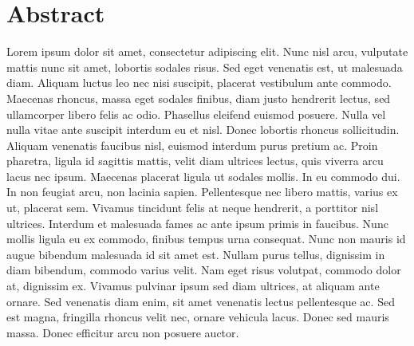 \chapter*{Abstract}

Lorem ipsum dolor sit amet, consectetur adipiscing elit. Nunc nisl arcu, vulputate mattis nunc sit 
amet, lobortis sodales risus. Sed eget venenatis est, ut malesuada diam. Aliquam luctus leo nec 
nisi suscipit, placerat vestibulum ante commodo. Maecenas rhoncus, massa eget sodales finibus, diam
justo hendrerit lectus, sed ullamcorper libero felis ac odio. Phasellus eleifend euismod posuere.
Nulla vel nulla vitae ante suscipit interdum eu et nisl. Donec lobortis rhoncus sollicitudin. 
Aliquam venenatis faucibus nisl, euismod interdum purus pretium ac. Proin pharetra, ligula id
sagittis mattis, velit diam ultrices lectus, quis viverra arcu lacus nec ipsum. Maecenas placerat
ligula ut sodales mollis. In eu commodo dui. In non feugiat arcu, non lacinia sapien. Pellentesque
nec libero mattis, varius ex ut, placerat sem. Vivamus tincidunt felis at neque hendrerit, a 
porttitor nisl ultrices. Interdum et malesuada fames ac ante ipsum primis in faucibus. Nunc mollis 
ligula eu ex commodo, finibus tempus urna consequat. Nunc non mauris id augue bibendum malesuada 
id sit amet est. Nullam purus tellus, dignissim in diam bibendum, commodo varius velit. Nam eget 
risus volutpat, commodo dolor at, dignissim ex. Vivamus pulvinar ipsum sed diam ultrices, at 
aliquam ante ornare. Sed venenatis diam enim, sit amet venenatis lectus pellentesque ac. Sed est 
magna, fringilla rhoncus velit nec, ornare vehicula lacus. Donec sed mauris massa. Donec efficitur 
arcu non posuere auctor.

\cleardoublepage

